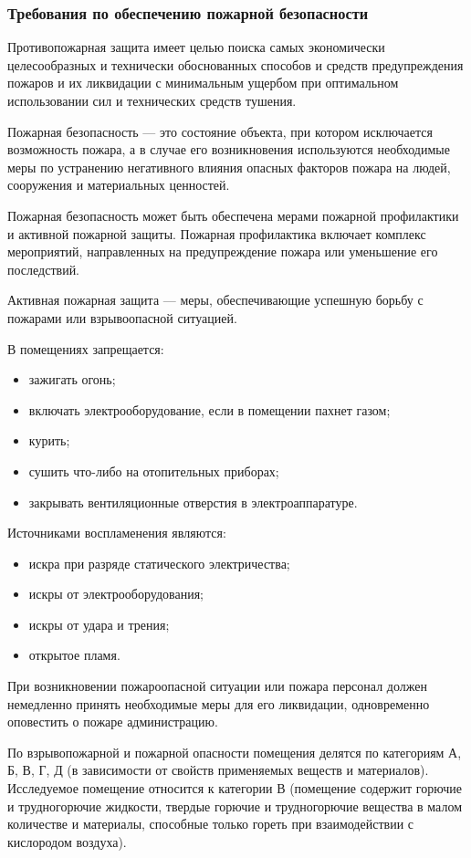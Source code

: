\subsubsection{Требования по обеспечению пожарной безопасности}

Противопожарная защита имеет целью поиска самых экономически целесообразных и технически обоснованных способов и средств предупреждения пожаров и их ликвидации с минимальным ущербом при оптимальном использовании сил и технических средств тушения.

Пожарная безопасность --- это состояние объекта, при котором исключается возможность пожара, а в случае его возникновения используются необходимые меры по устранению негативного влияния опасных факторов пожара на людей, сооружения и материальных ценностей.

Пожарная безопасность может быть обеспечена мерами пожарной профилактики и активной пожарной защиты.
Пожарная профилактика включает комплекс мероприятий, направленных на предупреждение пожара или уменьшение его последствий.

Активная пожарная защита --- меры, обеспечивающие успешную борьбу с пожарами или взрывоопасной ситуацией.

В помещениях запрещается:
\begin{itemize}
  \item зажигать огонь;
  \item включать электрооборудование, если в помещении пахнет газом;
  \item курить;
  \item сушить что-либо на отопительных приборах;
  \item закрывать вентиляционные отверстия в электроаппаратуре.
\end{itemize}

Источниками воспламенения являются:
\begin{itemize}
  \item искра при разряде статического электричества;
  \item искры от электрооборудования;
  \item искры от удара и трения;
  \item открытое пламя.
\end{itemize}

При возникновении пожароопасной ситуации или пожара персонал должен немедленно принять необходимые меры для его ликвидации, одновременно оповестить о пожаре администрацию.

По взрывопожарной и пожарной опасности помещения делятся по категориям А, Б, В, Г, Д (в зависимости от свойств применяемых веществ и материалов). Исследуемое  помещение относится к категории В (помещение содержит горючие и трудногорючие жидкости, твердые горючие и трудногорючие вещества в малом количестве и материалы, способные только гореть при взаимодействии с кислородом воздуха).

